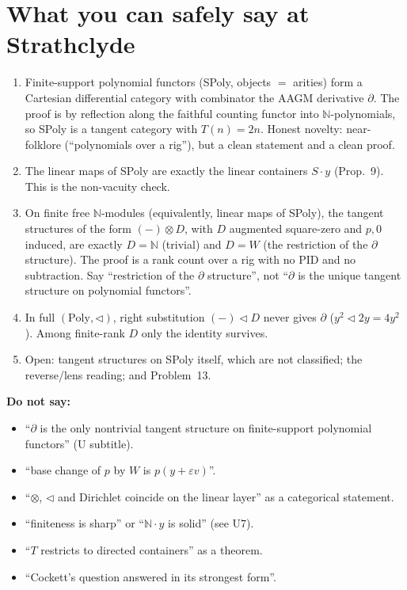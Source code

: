\documentclass[11pt]{article}
\newcommand{\tri}{\mathbin{\triangleleft}}
\newcommand{\N}{\mathbb{N}}
\begin{document}
\section{What you can safely say at Strathclyde}
\begin{enumerate}[leftmargin=*]
\item Finite-support polynomial functors (SPoly, objects $=$ arities) form a Cartesian differential
category with combinator the AAGM derivative $\partial$. The proof is by reflection along the
faithful counting functor into $\N$-polynomials, so SPoly is a tangent category with $T(n)=2n$.
Honest novelty: near-folklore (``polynomials over a rig''), but a clean statement and a clean proof.
\item The linear maps of SPoly are exactly the linear containers $S\cdot y$ (Prop.~9). This is the
non-vacuity check.
\item On finite free $\N$-modules (equivalently, linear maps of SPoly), the tangent structures of
the form $(-)\otimes D$, with $D$ augmented square-zero and $p,0$ induced, are exactly $D=\N$
(trivial) and $D=W$ (the restriction of the $\partial$ structure). The proof is a rank count over a
rig with no PID and no subtraction. Say ``restriction of the $\partial$ structure'', not
``$\partial$ is the unique tangent structure on polynomial functors''.
\item In full $(\mathrm{Poly},\tri)$, right substitution $(-)\tri D$ never gives $\partial$
($y^2\tri2y=4y^2$). Among finite-rank $D$ only the identity survives.
\item Open: tangent structures on SPoly itself, which are not classified; the reverse/lens reading;
and Problem~13.
\end{enumerate}
\textbf{Do not say:}
\begin{itemize}[leftmargin=1.2em]
\item ``$\partial$ is the only nontrivial tangent structure on finite-support polynomial functors''
(U subtitle).
\item ``base change of $p$ by $W$ is $p(y+\varepsilon v)$''.
\item ``$\otimes$, $\tri$ and Dirichlet coincide on the linear layer'' as a categorical statement.
\item ``finiteness is sharp'' or ``$\N\cdot y$ is solid'' (see U7).
\item ``$T$ restricts to directed containers'' as a theorem.
\item ``Cockett's question answered in its strongest form''.
\end{itemize}
\end{document}
